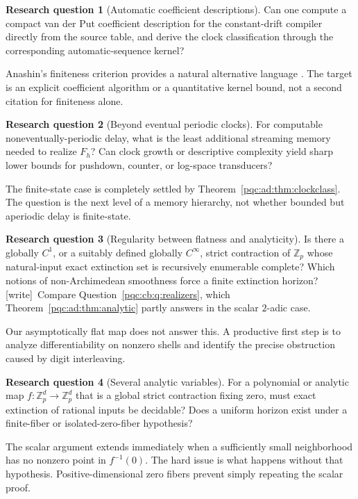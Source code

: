 \documentclass[11pt,letterpaper]{article}
\numberwithin{equation}{section}
\theoremstyle{definition}
\newtheorem{question}{Research question}
\theoremstyle{remark}
\newcommand{\wtag}{\textup{[write]}}
\newcommand{\Zp}{\mathbb Z_p}
\begin{document}
\begin{question}[Automatic coefficient descriptions]
Can one compute a compact van der Put coefficient description for the
constant-drift compiler directly from the source table, and derive the
clock classification through the corresponding automatic-sequence kernel?
\end{question}
Anashin's finiteness criterion provides a natural alternative language
\cite{b62s12-anashin}. The target is an explicit coefficient algorithm or a
quantitative kernel bound, not a second citation for finiteness alone.

\begin{question}[Beyond eventual periodic clocks]
For computable noneventually-periodic delay, what is the least additional
streaming memory needed to realize $F_h$? Can clock growth or descriptive
complexity yield sharp lower bounds for pushdown, counter, or log-space
transducers?
\end{question}
The finite-state case is completely settled by
Theorem~\ref{pqc:ad:thm:clockclass}. The question is the next level of a memory
hierarchy, not whether bounded but aperiodic delay is finite-state.

\begin{question}[Regularity between flatness and analyticity]\label{pqc:ad:q:regularity}
Is there a globally $C^1$, or a suitably defined globally $C^\infty$,
strict contraction of $\Zp$ whose natural-input exact extinction set is
recursively enumerable complete? Which notions of non-Archimedean
smoothness force a finite extinction horizon?
\wtag\ Compare Question~\ref{pqc:cb:q:realizers}, which Theorem~\ref{pqc:ad:thm:analytic} partly answers in the scalar $2$-adic case.
\end{question}
Our asymptotically flat map does not answer this. A productive first step
is to analyze differentiability on nonzero shells and identify the precise
obstruction caused by digit interleaving.

\begin{question}[Several analytic variables]
For a polynomial or analytic map $f\colon\Zp^d\to\Zp^d$ that is a global
strict contraction fixing zero, must exact extinction of rational inputs
be decidable? Does a uniform horizon exist under a finite-fiber or
isolated-zero-fiber hypothesis?
\end{question}
The scalar argument extends immediately when a sufficiently small
neighborhood has no nonzero point in $f^{-1}(0)$. The hard issue is what
happens without that hypothesis. Positive-dimensional zero fibers prevent
simply repeating the scalar proof.
\end{document}
